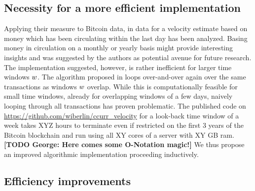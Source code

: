 \subsection{Necessity for a more efficient implementation}
\label{sec:necessity_effi}%
Applying their measure to Bitcoin data, in \cite{pernice2019cryptocurrencies} data for a velocity estimate based on money which has been circulating within the last day has been analyzed. %
Basing money in circulation on a monthly or yearly basis might provide interesting insights and was suggested by the authors as potential avenue for future research. %
The implementation suggested, however, is rather inefficient for larger time windows \({w}\). %
The algorithm proposed in \cite{pernice2019cryptocurrencies} loops over-and-over again over the same transactions as windows \({w}\) overlap. %
While this is computationally feasible for small time windows, already for overlapping windows of a few days, naively looping through all transactions has proven problematic. %
The published code on \url{https://github.com/wiberlin/ccurr_velocity} for a look-back time window of a week takes XYZ hours to terminate even if restricted on the first 3 years of the Bitcoin blockchain and run using all XY cores of a server with XY GB ram. 
\textbf{[TODO George: Here comes some O-Notation magic!]}
We thus propose an improved algorithmic implementation proceeding inductively. %


\subsection{Efficiency improvements}
\label{sec:novel_impl}%

